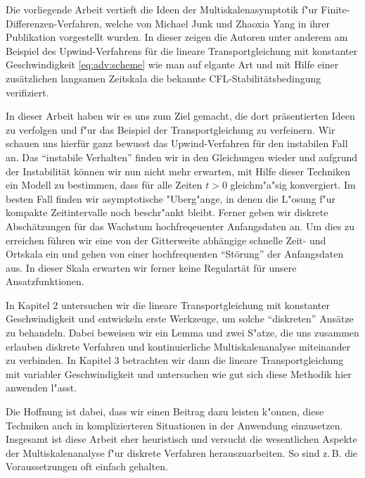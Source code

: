 
Die vorliegende Arbeit vertieft die Ideen der Multiskalenasymptotik f"ur Finite-Dif\-fe\-ren\-zen-Verfahren, welche von Michael Junk und Zhaoxia Yang in ihrer Publikation \cite{Junk2004} vorgestellt wurden.
In dieser zeigen die Autoren unter anderem am Beispiel des Upwind-Ver\-fahrens für die lineare Transportgleichung mit konstanter Geschwindigkeit \eqref{eq:adv:scheme} wie man auf elgante Art und mit Hilfe einer zusätzlichen langsamen Zeitskala die bekannte CFL-Sta\-bi\-li\-täts\-bedingung verifiziert.

In dieser Arbeit haben wir es uns zum Ziel gemacht, die dort präsentierten Ideen zu verfolgen und f"ur das Beispiel der Transportgleichung zu verfeinern.
Wir schauen uns hierfür ganz bewusst das Upwind-Verfahren für den instabilen Fall an.
Das ``instabile Verhalten'' finden wir in den Gleichungen wieder und
aufgrund der Instabilität können wir nun nicht mehr erwarten, mit Hilfe dieser Techniken ein Modell zu bestimmen, dass für alle Zeiten $t > 0$ gleichm"a"sig konvergiert.
Im besten Fall finden wir asymptotische "Uberg"ange, in denen die L"osung f"ur kompakte Zeitintervalle noch beschr"ankt bleibt.
Ferner geben wir diskrete Abschätzungen für das Wachstum hochfreqeuenter Anfangsdaten an.
Um dies zu erreichen führen wir eine von der Gitterweite abhängige schnelle Zeit- und Ortskala ein und gehen von einer hochfrequenten ``Störung'' der Anfangsdaten aus.
In dieser Skala erwarten wir ferner keine Regulartät für unsere Ansatzfunktionen.

In Kapitel 2 untersuchen wir die lineare Transportgleichung mit konstanter Geschwindigkeit und entwickeln erste Werkzeuge, um solche ``diskreten'' Ansätze zu behandeln.
Dabei beweisen wir ein Lemma und zwei S"atze, die uns zusammen erlauben diskrete Verfahren und kontinuierliche Multiskalenanalyse miteinander zu verbinden.
In Kapitel 3 betrachten wir dann die lineare Transportgleichung mit variabler Geschwindigkeit und untersuchen wie gut sich diese Methodik hier anwenden l"asst.

Die Hoffnung ist dabei, dass wir einen Beitrag dazu leisten k"onnen, diese Techniken auch in komplizierteren Situationen in der Anwendung einzusetzen.
Insgesamt ist diese Arbeit eher heuristisch und versucht die wesentlichen Aspekte der Multiskalenanalyse f"ur diskrete Verfahren herauszuarbeiten.
So sind z.\,B. die Voraussetzungen oft einfach gehalten.


